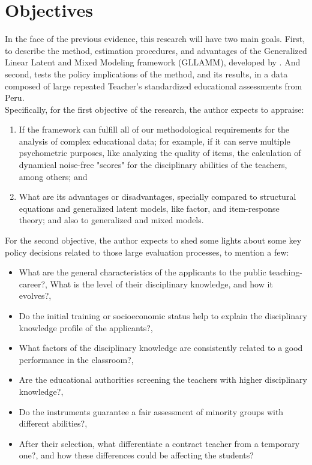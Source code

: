 \section{Objectives}

In the face of the previous evidence, this research will have two main goals. First, to describe the method, estimation procedures, and advantages of the Generalized Linear Latent and Mixed Modeling framework (GLLAMM), developed by \citet{Rabe_et_al_2004a, Rabe_et_al_2004b, Skrondal_et_al_2004a, Rabe_et_al_2012}. And second, tests the policy implications of the method, and its results, in a data composed of large repeated Teacher's standardized educational assessments from Peru. \\

\noindent Specifically, for the first objective of the research, the author expects to appraise: 

\begin{enumerate}
	\item If the framework can fulfill all of our methodological requirements for the analysis of complex educational data; for example, if it can serve multiple psychometric purposes, like analyzing the quality of items, the calculation of dynamical noise-free "scores" for the disciplinary abilities of the teachers, among others; and
	
	\item What are its advantages or disadvantages, specially compared to structural equations and generalized latent models, like factor, and item-response theory; and also to generalized and mixed models.
\end{enumerate}

\noindent For the second objective, the author expects to shed some lights about some key policy decisions related to those large evaluation processes, to mention a few:

\begin{itemize}

	\item What are the general characteristics of the applicants to the public teaching-career?, What is the level of their disciplinary knowledge, and how it evolves?, 
	
	\item Do the initial training or socioeconomic status help to explain the disciplinary knowledge profile of the applicants?,
	
	\item What factors of the disciplinary knowledge are consistently related to a good performance in the classroom?,
	
	\item Are the educational authorities screening the teachers with higher disciplinary knowledge?,
	
	\item Do the instruments guarantee a fair assessment of minority groups with different abilities?,
	
	\item After their selection, what differentiate a contract teacher from a temporary one?, and how these differences could be affecting the students?   
\end{itemize}

